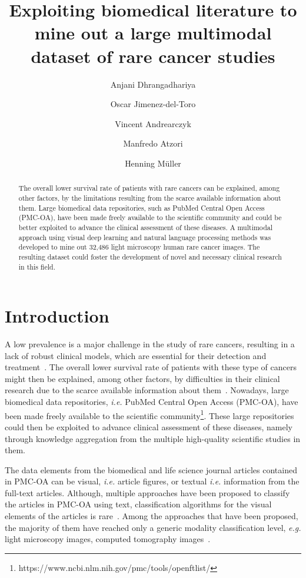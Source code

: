 \documentclass[]{spie}  %
\title{Exploiting biomedical literature to mine out a large multimodal dataset of rare cancer studies}
\author[a]{Anjani Dhrangadhariya}
\author[a]{Oscar Jimenez-del-Toro}
\author[a]{Vincent Andrearczyk}
\author[a]{Manfredo Atzori}
\author[a, b]{Henning M\"uller}
\affil[a]{University of Applied Sciences Western Switzerland (HES-SO), Sierre, Switzerland}
\affil[b]{University of Geneva (UNIGE), Geneva, Switzerland}
\begin{document}
 
\maketitle

\begin{abstract}
%
The overall lower survival rate of patients with rare cancers can be explained, among other factors, by the limitations resulting from the scarce available information about them. 
Large biomedical data repositories, such as PubMed Central Open Access (PMC-OA), have been made freely available to the scientific community and could be better exploited to advance the clinical assessment of these diseases.
A multimodal approach using visual deep learning and natural language processing methods was developed to mine out 32,486 light microscopy human rare cancer images.
The resulting dataset could foster the development of novel and necessary clinical research in this field. 
%
\end{abstract}
%

%
\section{Introduction}
\label{sec:intro} 
%
A low prevalence is a major challenge in the study of rare cancers, resulting in a lack of robust clinical models, which are essential for their detection and treatment~\cite{PBP2018}.
The overall lower survival rate of patients with these type of cancers might then be explained, among other factors, by difficulties in their clinical research due to the scarce available information about them~\cite{GCB2017}. 
Nowadays, large biomedical data repositories, \emph{i.e.} PubMed Central Open Access (PMC-OA), have been made freely available to the scientific community\footnote{https://www.ncbi.nlm.nih.gov/pmc/tools/openftlist/}.
These large repositories could then be exploited to advance clinical assessment of these diseases, namely through knowledge aggregation from the multiple high-quality scientific studies in them.

The data elements from the biomedical and life science journal articles contained in PMC-OA can be visual, \emph{i.e.} article figures, or textual \emph{i.e.} information from the full-text articles.
Although, multiple approaches have been proposed to classify the articles in PMC-OA using text, classification algorithms for the visual elements of the articles is rare~\cite{MAJ2020}.
Among the approaches that have been proposed, the majority of them have reached only a generic modality classification level, \emph{e.g.} light microscopy images, computed tomography images~\cite{KGD2015,KKL2016}.
\end{document}
